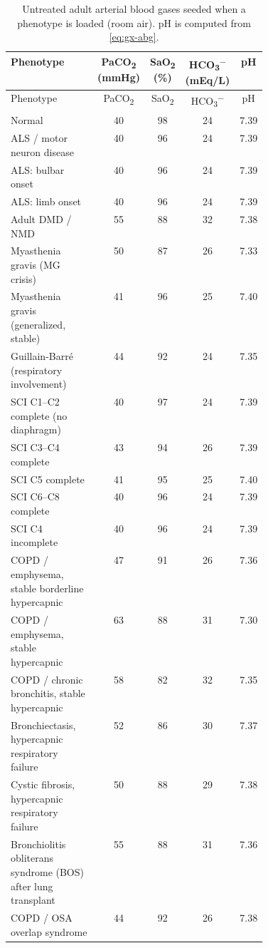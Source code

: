 {\small\begin{longtable}{@{}>{\raggedright\arraybackslash}p{0.42\linewidth}cccc@{}}
\caption{Untreated adult arterial blood gases seeded when a phenotype is loaded (room air). pH is computed from \cref{eq:gx-abg}.}\label{tab:par-abg}\\
\toprule Phenotype & PaCO\textsubscript{2} (mmHg) & SaO\textsubscript{2} (\%) & HCO\textsubscript{3}\textsuperscript{$-$} (mEq/L) & pH\\\midrule\endfirsthead
\toprule Phenotype & PaCO\textsubscript{2} & SaO\textsubscript{2} & HCO\textsubscript{3}\textsuperscript{$-$} & pH\\\midrule\endhead\bottomrule\endfoot
Normal & 40 & 98 & 24 & 7.39\\
ALS / motor neuron disease & 40 & 96 & 24 & 7.39\\
ALS: bulbar onset & 40 & 96 & 24 & 7.39\\
ALS: limb onset & 40 & 96 & 24 & 7.39\\
Adult DMD / NMD & 55 & 88 & 32 & 7.38\\
Myasthenia gravis (MG crisis) & 50 & 87 & 26 & 7.33\\
Myasthenia gravis (generalized, stable) & 41 & 96 & 25 & 7.40\\
Guillain-Barr\'e (respiratory involvement) & 44 & 92 & 24 & 7.35\\
SCI C1--C2 complete (no diaphragm) & 40 & 97 & 24 & 7.39\\
SCI C3--C4 complete & 43 & 94 & 26 & 7.39\\
SCI C5 complete & 41 & 95 & 25 & 7.40\\
SCI C6--C8 complete & 40 & 96 & 24 & 7.39\\
SCI C4 incomplete & 40 & 96 & 24 & 7.39\\
COPD / emphysema, stable borderline hypercapnic & 47 & 91 & 26 & 7.36\\
COPD / emphysema, stable hypercapnic & 63 & 88 & 31 & 7.30\\
COPD / chronic bronchitis, stable hypercapnic & 58 & 82 & 32 & 7.35\\
Bronchiectasis, hypercapnic respiratory failure & 52 & 86 & 30 & 7.37\\
Cystic fibrosis, hypercapnic respiratory failure & 50 & 88 & 29 & 7.38\\
Bronchiolitis obliterans syndrome (BOS) after lung transplant & 55 & 88 & 31 & 7.36\\
COPD / OSA overlap syndrome & 44 & 92 & 26 & 7.38\\

\end{longtable}}
